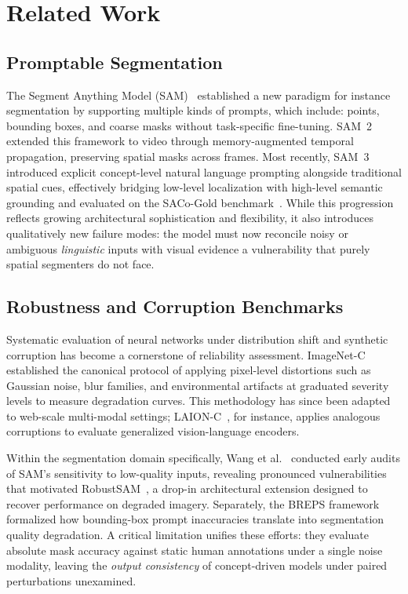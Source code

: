 \documentclass[10pt,twocolumn,letterpaper]{article}
\begin{document}
\section{Related Work}
\label{sec:related}

\subsection{Promptable Segmentation}

The Segment Anything Model (SAM)~\cite{kirillov2023sam} established a new paradigm for instance segmentation by supporting multiple kinds of prompts, which include: points, bounding boxes, and coarse masks without task-specific fine-tuning. SAM~2~\cite{ravi2024sam2} extended this framework to video through memory-augmented temporal propagation, preserving spatial masks across frames. Most recently, SAM~3~\cite{peng2025sam3} introduced explicit concept-level natural language prompting alongside traditional spatial cues, effectively bridging low-level localization with high-level semantic grounding and evaluated on the SACo-Gold benchmark~\cite{meta2025saco}. While this progression reflects growing architectural sophistication and flexibility, it also introduces qualitatively new failure modes: the model must now reconcile noisy or ambiguous \emph{linguistic} inputs with visual evidence a vulnerability that purely spatial segmenters do not face.

\subsection{Robustness and Corruption Benchmarks}

Systematic evaluation of neural networks under distribution shift and synthetic corruption has become a cornerstone of reliability assessment. ImageNet-C~\cite{hendrycks2019benchmarking} established the canonical protocol of applying pixel-level distortions such as Gaussian noise, blur families, and environmental artifacts at graduated severity levels to measure degradation curves. This methodology has since been adapted to web-scale multi-modal settings; LAION-C~\cite{li2025laionc}, for instance, applies analogous corruptions to evaluate generalized vision-language encoders.

Within the segmentation domain specifically, Wang et al.~\cite{wang2023empirical} conducted early audits of SAM's sensitivity to low-quality inputs, revealing pronounced vulnerabilities that motivated RobustSAM~\cite{chen2024robustsam}, a drop-in architectural extension designed to recover performance on degraded imagery. Separately, the BREPS framework~\cite{moskalenko2026breps} formalized how bounding-box prompt inaccuracies translate into segmentation quality degradation. A critical limitation unifies these efforts: they evaluate absolute mask accuracy against static human annotations under a single noise modality, leaving the \emph{output consistency} of concept-driven models under paired perturbations unexamined.
\end{document}
